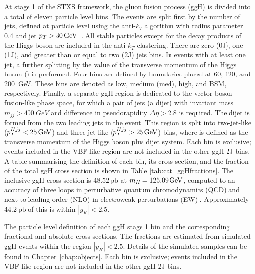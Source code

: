 At stage 1 of the STXS framework, 
the gluon fusion process (ggH) is divided into a total of eleven particle level bins.
The events are split first by the number of jets, 
defined at particle level using the anti-$k_T$ algorithm with radius parameter 0.4 
and jet $p_T > \SI{30}{GeV}$~\cite{AntiKt}.
All stable particles except for the decay products of the Higgs boson 
are included in the anti-$k_T$ clustering.
There are zero (0J), one (1J), and greater than or equal to two (2J) jets bins.
In events with at least one jet, a further splitting 
by the value of the transverse momentum of the Higgs boson (\ptH) is performed. 
Four bins are defined by boundaries placed at 60, 120, and \SI{200}{GeV}.
These bins are denoted as low, medium (med), high, and BSM, respectively.
Finally, a separate ggH region is dedicated to the vector boson fusion-like phase space, 
for which a pair of jets (a dijet) with invariant mass $m_{jj} > \SI{400}{GeV}$ 
and difference in pseudorapidity $\Delta\eta > 2.8$ is required.
The dijet is formed from the two leading jets in the event.
This region is split into two-jet-like ($p_T^{Hjj} < \SI{25}{GeV}$) 
and three-jet-like ($p_T^{Hjj} > \SI{25}{GeV}$) bins, 
where \ptHjj is defined as the transverse momentum of the Higgs boson plus dijet system.
Each bin is exclusive; events included in the VBF-like region are not included in the other ggH 2J bins.
A table summarising the definition of each bin, its cross section, and the fraction of the 
total ggH cross section is shown in Table \ref{tab:cat_ggHfractions}.
The inclusive ggH cross section is $48.52~\textrm{pb}$ at $m_{H} = \SI{125.09}{GeV}$, 
computed to an accuracy of three loops in perturbative quantum chromodynamics (QCD) 
and next-to-leading order (NLO) in electroweak perturbations (EW) 
\cite{YR4,Anastasiou2015,Anastasiou2016}.
Approximately $44.2~\textrm{pb}$ of this is within $|y_H| < 2.5$.

\begin{table}
  \begin{centering}
    
    \caption[Particle level definitions of the ggH stage 1 STXS bins.]
    {
      The particle level definition of each ggH stage 1 bin 
      and the corresponding fractional and absolute cross sections.
      The fractions are estimated from simulated ggH \Hgg events 
      within the region $|y_H| < 2.5$.
      Details of the simulated samples can be found in Chapter~\ref{chap:objects}.
      Each bin is exclusive; 
      events included in the VBF-like region are not included in the other ggH 2J bins.
    }
    \label{tab:cat_ggHfractions}
  \end{centering}
\end{table}

